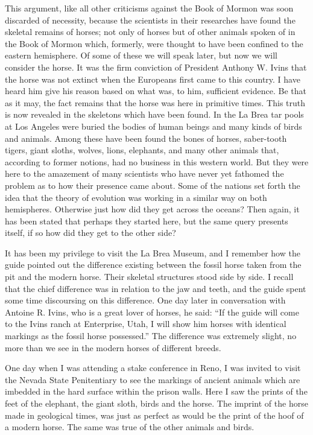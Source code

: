 This argument, like all other criticisms against the Book of Mormon was soon discarded of
necessity, because the scientists in their researches have found the skeletal remains of horses;
not only of horses but of other animals spoken of in the Book of Mormon which, formerly,
were thought to have been confined to the eastern hemisphere. Of some of these we will
speak later, but now we will consider the horse. It was the firm conviction of President
Anthony W. Ivins that the horse was not extinct when the Europeans first came to this
country. I have heard him give his reason based on what was, to him, sufficient evidence. Be
that as it may, the fact remains that the horse was here in primitive times. This truth is now
revealed in the skeletons which have been found. In the La Brea tar pools at Los Angeles
were buried the bodies of human beings and many kinds of birds and animals. Among these
have been found the bones of horses, saber-tooth tigers, giant sloths, wolves, lions, elephants,
and many other animals that, according to former notions, had no business in this western
world. But they were here to the amazement of many scientists who have never yet fathomed
the problem as to how their presence came about. Some of the nations set forth the idea that
the theory of evolution was working in a similar way on both hemispheres. Otherwise just
how did they get across the oceans? Then again, it has been stated that perhaps they started
here, but the same query presents itself, if so how did they get to the other side?

It has been my privilege to visit the La Brea Museum, and I remember how the guide pointed
out the difference existing between the fossil horse taken from the pit and the modern horse.
Their skeletal structures stood side by side. I recall that the chief difference was in relation to
the jaw and teeth, and the guide spent some time discoursing on this difference. One day later
in conversation with Antoine R. Ivins, who is a great lover of horses, he said: ``If the guide
will come to the Ivins ranch at Enterprise, Utah, I will show him horses with identical
markings as the fossil horse possessed.'' The difference was extremely slight, no more than
we see in the modern horses of different breeds.

One day when I was attending a stake conference in Reno, I was invited to visit the Nevada
State Penitentiary to see the markings of ancient animals which are imbedded in the hard
surface within the prison walls. Here I saw the prints of the feet of the elephant, the giant
sloth, birds and the horse. The imprint of the horse made in geological times, was just as
perfect as would be the print of the hoof of a modern horse. The same was true of the other
animals and birds.

